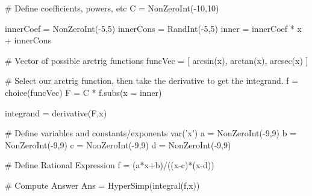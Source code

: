\begin{sagesilent}
# Define coefficients, powers, etc
C = NonZeroInt(-10,10)

innerCoef = NonZeroInt(-5,5)
innerCons = RandInt(-5,5)
inner = innerCoef * x + innerCons

# Vector of possible arctrig functions
funcVec = [
  arcsin(x), 
  arctan(x), 
  arcsec(x)
]

# Select our arctrig function, then take the derivative to get the integrand.
f = choice(funcVec)
F = C * f.subs(x = inner)

integrand = derivative(F,x)
\end{sagesilent}


\begin{sagesilent}
# Define variables and constants/exponents
var('x')
a = NonZeroInt(-9,9)
b = NonZeroInt(-9,9)
c = NonZeroInt(-9,9)
d = NonZeroInt(-9,9)


# Define Rational Expression
f = (a*x+b)/((x-c)*(x-d))

# Compute Answer
Ans = HyperSimp(integral(f,x))
\end{sagesilent}






